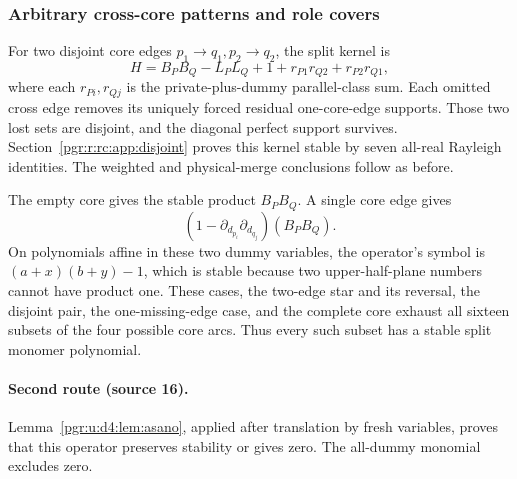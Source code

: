 \documentclass[11pt]{article}
\numberwithin{equation}{section}
\theoremstyle{definition}\newtheorem{definition}[theorem]{Definition}\newtheorem{remark}[theorem]{Remark}
\begin{document}
\subsubsection{Arbitrary cross-core patterns and role covers}
For two disjoint core edges $p_1\to q_1,p_2\to q_2$, the split kernel is
\[
 H=B_PB_Q-L_PL_Q+1+r_{P1}r_{Q2}+r_{P2}r_{Q1},
\]
where each $r_{Pi},r_{Qj}$ is the private-plus-dummy parallel-class sum. Each omitted cross edge removes its uniquely forced residual one-core-edge supports. Those two lost sets are disjoint, and the diagonal perfect support survives. Section~\ref{pgr:r:rc:app:disjoint} proves this kernel stable by seven all-real Rayleigh identities. The weighted and physical-merge conclusions follow as before.

The empty core gives the stable product $B_PB_Q$. A single core edge gives
\[
 (1-\partial_{d_{p_i}}\partial_{d_{q_j}})(B_PB_Q).
\]
On polynomials affine in these two dummy variables, the operator's symbol is
$(a+x)(b+y)-1$, which is stable because two upper-half-plane numbers cannot have product one. These cases, the two-edge star and its reversal, the disjoint pair, the one-missing-edge case, and the complete core exhaust all sixteen subsets of the four possible core arcs. Thus every such subset has a stable split monomer polynomial.

\paragraph{Second route (source 16).} Lemma~\ref{pgr:u:d4:lem:asano},
applied after translation by fresh variables, proves that this operator
preserves stability or gives zero. The all-dummy monomial excludes zero.
\end{document}
